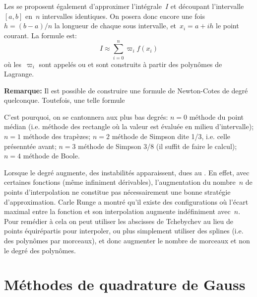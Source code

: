 Les  se proposent également d'approximer
l'intégrale~$I$ et découpant l'intervalle~$[a,b]$ en~$n$ intervalles identiques.
On posera donc encore une fois~$h=(b-a)/n$ la longueur de chaque sous intervalle, 
et~$x_i=a+ih$ le point courant.
La formule est:
\begin{equation} I\approx \sum_{i=0}^n \varpi_i f(x_i) \end{equation}
où les~$\varpi_i$ sont appelés  ou  et sont construits à partir des polynômes de Lagrange.

\medskip
{}

\medskip
\textbf{Remarque:}
Il est possible de construire une formule de Newton-Cotes de degré quelconque.
Toutefois, une telle formule 

C'est pourquoi, on se cantonnera aux plus bas degrés:
$n=0$ méthode du point médian (i.e. méthode des rectangle où la valeur est
évaluée en milieu d'intervalle); 
$n=1$ méthode des trapèzes;
$n=2$ méthode de Simpson dite 1/3, i.e. celle présenntée avant;
$n=3$ méthode de Simpson 3/8 (il suffit de faire le calcul);
$n=4$ méthode de Boole.

Lorsque le degré augmente, des instabilités apparaissent, dues au
.
En effet, avec certaines fonctions (même infiniment dérivables), l'augmentation 
du nombre~$n$ de points d'interpolation ne constitue pas nécessairement une bonne 
stratégie d'approximation.
Carle Runge a montré qu'il existe des configurations où l'écart maximal entre la fonction 
et son interpolation augmente indéfiniment avec~$n$.
Pour remédier à cela on peut utiliser les abscisses de Tchebychev 
au lieu de points équirépartis pour interpoler, ou plus simplement utiliser des splines (i.e. des polynômes 
par morceaux), et donc augmenter le nombre de morceaux et non le degré des polynômes.








\medskip
\section{Méthodes de quadrature de Gauss}


